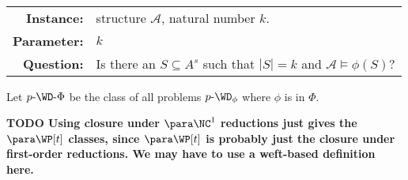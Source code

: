 \documentclass{article}
\newcommand{\todo}[1]{\textbf{TODO #1}}
\newcommand{\dash}{\textnormal{-}}
\newcommand{\cl}[1]{\left[{#1}\right]}
\begin{document}
\begin{definition}[{$p \dash \WD_\phi$ \autocite[Section~5.1]{fg06}}]
  \mbox{} \\
  \begin{tabular}{r p{9.2cm}}
    \textbf{Instance:} & structure $\mathcal{A}$, natural number $k$. \\
    \textbf{Parameter:} & $k$ \\
    \textbf{Question:} & Is there an $S \subseteq A^s$ such that $|S| = k$ and $\mathcal{A} \models \phi(S)$?
  \end{tabular}
\end{definition}

Let $p \dash \WD \dash \Phi$ be the class of all problems $p \dash \WD_\phi$ where $\phi$ is in $\Phi$.

\todo{
  Using closure under $\para \NC^1$ reductions just gives the $\para \WP[t]$ classes, since $\para \WP[t]$ is probably just the closure under first-order reductions.
  We may have to use a weft-based definition here.
}






\end{document}
